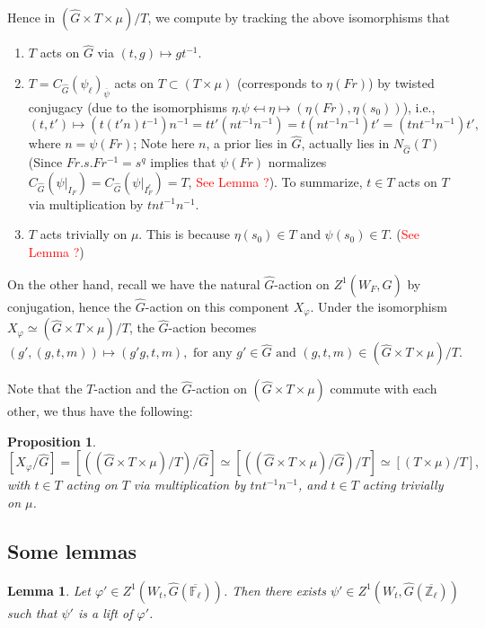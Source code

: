 \documentclass{article}
\newcommand{\red}[1]{\textcolor{red}{#1}}
\newtheorem{lemma}{Lemma}
\newtheorem{proposition}{Proposition}
\begin{document}
Hence in $(\hat{G} \times T \times \mu)/T$, we compute by tracking the above isomorphisms that 
\begin{enumerate}
	\item $T$ acts on $\hat{G}$ via $(t, g) \mapsto gt^{-1}$.
	\item $T=C_{\hat{G}}(\psi_{\ell})_{\overline{\psi}}$ acts on $T \subset (T \times \mu)$ (corresponds to $\eta(Fr)$) by twisted conjugacy (due to the isomorphisms $\eta.\psi \mapsfrom \eta \mapsto (\eta(Fr), \eta(s_0))$), i.e., 
	$$(t, t') \mapsto \left(t(t'n)t^{-1}\right)n^{-1}=tt'(nt^{-1}n^{-1})=t(nt^{-1}n^{-1})t'=(tnt^{-1}n^{-1})t',$$
	where $n=\psi(Fr)$; Note here $n$, a prior lies in $\hat{G}$, actually lies in $N_{\hat{G}}(T)$ (Since $Fr.s.Fr^{-1}=s^q$ implies that $\psi(Fr)$ normalizes $C_{\hat{G}}(\psi|_{I_F})=C_{\hat{G}}(\psi|_{I_F^{\ell}})=T$, \red{See Lemma ?}). To summarize, $t \in T$ acts on $T$ via multiplication by $tnt^{-1}n^{-1}$.
	\item $T$ acts trivially on $\mu$. This is because $\eta(s_0) \in T$ and $\psi(s_0) \in T$. (\red{See Lemma ?})
\end{enumerate}

On the other hand, recall we have the natural $\hat{G}$-action on $Z^1(W_F, \hat{G})$ by conjugation, hence the $\hat{G}$-action on this component $X_{\varphi}$. Under the isomorphism $X_{\varphi} \simeq (\hat{G} \times T \times \mu)/T$, the $\hat{G}$-action becomes
$$(g', (g, t, m)) \mapsto  (g'g, t, m), \text{ for any } g' \in \hat{G} \text{ and } (g, t, m) \in (\hat{G} \times T \times \mu)/T.$$

Note that the $T$-action and the $\hat{G}$-action on $(\hat{G} \times T \times \mu)$ commute with each other, we thus have the following:

\begin{proposition}\label{T times mu/T}
	$$[X_{\varphi}/\hat{G}]=\left[\left((\hat{G} \times T \times \mu)/T\right)/\hat{G}\right] \simeq \left[\left((\hat{G} \times T \times \mu)/\hat{G}\right)/T\right] \simeq [(T \times \mu)/T],$$ 
	with $t \in T$ acting on $T$ via multiplication by $tnt^{-1}n^{-1}$, and $t \in T$ acting trivially on $\mu$. 
\end{proposition}

\subsection{Some lemmas}

\begin{lemma}\label{Lem generalizing}
	Let $\varphi' \in Z^1(W_t, \hat{G}(\overline{\mathbb{F}_{\ell}}))$. Then there exists $\psi' \in Z^1(W_t, \hat{G}(\overline{\mathbb{Z}_{\ell}}))$ such that $\psi'$ is a lift of $\varphi'$.
\end{lemma}
\end{document}
